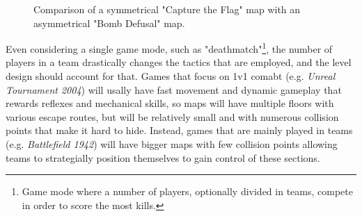 \documentclass{Configuration_Files/PoliMi3i_thesis}
\begin{document}
\begin{figure}[hbt!]
    \centering
    \quad
    \caption[Map comparison]{Comparison of a symmetrical "Capture the Flag" map with an asymmetrical "Bomb Defusal" map.}
    \label{fig:maps_compare}
\end{figure}

Even considering a single game mode, such as "deathmatch"\footnote{Game mode where a number of players, optionally divided in teams, compete in order to score the most kills.}, the number of players in a team drastically changes the tactics that are employed, and the level design should account for that. Games that focus on 1v1 comabt (e.g. \textit{Unreal Tournament 2004}) will usally have fast movement and dynamic gameplay that rewards reflexes and mechanical skills, so maps will have multiple floors with various escape routes, but will be relatively small and with numerous collision points that make it hard to hide. Instead, games that are mainly played in teams (e.g. \textit{Battlefield 1942}) will have bigger maps with few collision points allowing teams to strategially position themselves to gain control of these sections.
\end{document}
